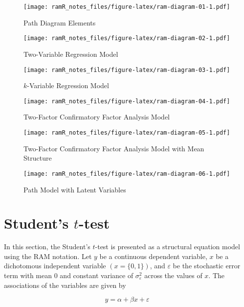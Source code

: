 \documentclass[
]{book}
\theoremstyle{definition}
\theoremstyle{definition}
\theoremstyle{definition}
\theoremstyle{remark}
\begin{document}
\begin{figure}
\centering
\texttt{[image: ramR\_notes\_files/figure-latex/ram-diagram-01-1.pdf]}
\caption{\label{fig:ram-diagram-01}Path Diagram Elements}
\end{figure}

\begin{figure}
\centering
\texttt{[image: ramR\_notes\_files/figure-latex/ram-diagram-02-1.pdf]}
\caption{\label{fig:ram-diagram-02}Two-Variable Regression Model}
\end{figure}

\begin{figure}
\centering
\texttt{[image: ramR\_notes\_files/figure-latex/ram-diagram-03-1.pdf]}
\caption{\label{fig:ram-diagram-03}\(k\)-Variable Regression Model}
\end{figure}

\begin{figure}
\centering
\texttt{[image: ramR\_notes\_files/figure-latex/ram-diagram-04-1.pdf]}
\caption{\label{fig:ram-diagram-04}Two-Factor Confirmatory Factor Analysis Model}
\end{figure}

\begin{figure}
\centering
\texttt{[image: ramR\_notes\_files/figure-latex/ram-diagram-05-1.pdf]}
\caption{\label{fig:ram-diagram-05}Two-Factor Confirmatory Factor Analysis Model with Mean Structure}
\end{figure}

\begin{figure}
\centering
\texttt{[image: ramR\_notes\_files/figure-latex/ram-diagram-06-1.pdf]}
\caption{\label{fig:ram-diagram-06}Path Model with Latent Variables}
\end{figure}

\hypertarget{ram-t}{%
\chapter{\texorpdfstring{Student's \(t\)-test}{Student's t-test}}\label{ram-t}}

In this section,
the Student's \(t\)-test is presented as a structural equation model
using the RAM notation.
Let \(y\) be a continuous dependent variable,
\(x\) be a dichotomous independent variable
\(\left( x = \{0, 1\} \right)\),
and \(\varepsilon\) be the stochastic error term
with mean 0 and constant variance of \(\sigma_{\varepsilon}^{2}\)
across the values of \(x\).
The associations of the variables are given by

\begin{equation*}
  y
  =
  \alpha + \beta x + \varepsilon
\end{equation*}
\end{document}

